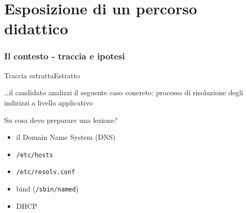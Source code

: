 \documentclass[italian]{beamer}
\begin{document}
\part[Percorso didattico]{Esposizione di un percorso didattico}
\frame{\partpage}

\section[Contesto]{Il contesto - traccia e ipotesi}

\begin{frame}{Traccia estratta}{Estratto}

	\begin{block}{\ldots{}il candidato analizzi il seguente caso concreto:}
		\large{processo di risoluzione degli indirizzi a livello applicativo}
	\end{block}
	
	\begin{block}{Su cosa devo preparare una lezione?}
		\begin{itemize}
			\item\alert<2>{il Domain Name System (DNS)}
			\item \texttt{/etc/hosts}
			\item \texttt{/etc/resolv.conf}
			\item bind (\texttt{/sbin/named})
			\item DHCP
		\end{itemize}
	\end{block}

\end{frame}
\end{document}

